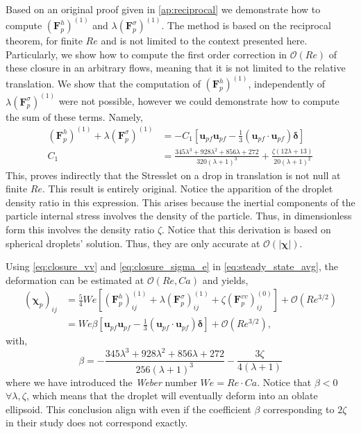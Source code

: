 Based on an original proof given in \ref{ap:reciprocal} we demonstrate how to compute $(\textbf{F}^h_p)^{(1)}$ and $\lambda (\textbf{F}^\sigma_p)^{(1)}$. 
The method is based on the reciprocal theorem, for finite $Re$ and is not limited to the context presented here.
Particularly, we show how to compute the first order correction in $\mathcal{O}(Re)$ of these closure in an arbitrary flows, meaning that it is not limited to the relative translation.
We show that the computation of $(\textbf{F}^h_p)^{(1)}$, independently of $\lambda (\textbf{F}^\sigma_p)^{(1)}$ were not possible, however we could demonstrate  how to compute the sum of these terms. 
Namely, 
\begin{align}
    (\textbf{F}^h_p)^{(1)}  
    + \lambda (\textbf{F}^\sigma_p)^{(1)}
    &=
    - C_1
    [
        \textbf{u}_{pf}\textbf{u}_{pf} - \frac{1}{3}(\textbf{u}_{pf}\cdot \textbf{u}_{pf})\bm\delta 
    ]\\
    C_1 &=
    \frac{345 \lambda^{3} + 928 \lambda^{2} + 856 \lambda + 272}{320 \left(\lambda + 1\right)^{3}}
    + \frac{\zeta \left(12 \lambda + 13\right)}{20 \left(\lambda + 1\right)^{2}}
    \label{eq:closure_sigma_e}
\end{align}
This, proves indirectly that the Stresslet on a drop in translation is not null at finite $Re$. 
This result is entirely original. 
Notice the apparition of the droplet density ratio in this expression. 
This arises because the inertial components of the particle internal stress involves the density of the particle. 
Thus, in dimensionless form this involves the density ratio $\zeta$.
Notice that this derivation is based on spherical droplets' solution. 
Thus, they are only accurate at $\mathcal{O}(|\bm\chi|)$. 


Using \ref{eq:closure_vv} and \ref{eq:closure_sigma_e} in  \ref{eq:steady_state_avg}, the deformation can be estimated at $\mathcal{O}(Re,Ca)$ and yields, 
\begin{align*}
    (\bm\chi_{p})_{ij}
    &= 
    \frac{5}{4}We \left[
        (\textbf{F}_p^h )_{ij}^{(1)}
        + \lambda (\textbf{F}_p^{\sigma})_{ij}^{(1)}
        + \zeta (\textbf{F}_p^{vv})_{ij}^{(0)}
    \right]
    + \mathcal{O}(Re^{3/2})\\
    &= We \beta [\textbf{u}_{pf}\textbf{u}_{pf} - \frac{1}{3}(\textbf{u}_{pf}\cdot \textbf{u}_{pf})\bm\delta ]
    + \mathcal{O}(Re^{3/2}),
\end{align*}
with, 
\begin{equation*}
    \beta = 
    - \frac{345 \lambda^{3} + 928 \lambda^{2} + 856 \lambda + 272}{256 \left(\lambda + 1\right)^{3}}
    - \frac{3 \zeta}{4 \left(\lambda + 1\right)} 
\end{equation*}
where we have introduced the \textit{Weber} number $We = Re \cdot Ca$. 
Notice that $\beta < 0$ $\forall \lambda,\zeta$, which means that the droplet will eventually deform into an oblate ellipsoid.
This conclusion align with \citet{taylor1964deformation} even if the coefficient $\beta$ corresponding to $2\zeta$ in their  study does not correspond exactly.   


